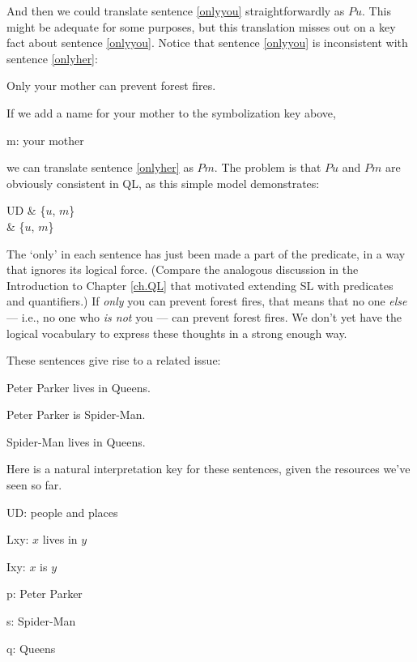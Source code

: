 And then we could translate sentence \ref{onlyyou} straightforwardly as $Pu$. This might be adequate for some purposes, but this translation misses out on a key fact about sentence \ref{onlyyou}. Notice that sentence \ref{onlyyou} is inconsistent with sentence \ref{onlyher}:

\begin{earg}
\item[\ex{onlyher}] Only your mother can prevent forest fires.
\end{earg}

If we add a name for your mother to the symbolization key above,

\begin{ekey}
\item[m:] your mother
\end{ekey}

we can translate sentence \ref{onlyher} as $Pm$. The problem is that $Pu$ and $Pm$ are obviously consistent in QL, as this simple model demonstrates:

\begin{partialmodel}
	UD & \{$u$, $m$\}\\
	 & \{$u$, $m$\}
\end{partialmodel}

The `only' in each sentence has just been made a part of the predicate, in a way that ignores its logical force. (Compare the analogous discussion in the Introduction to Chapter \ref{ch.QL} that motivated extending SL with predicates and quantifiers.) If \emph{only} you can prevent forest fires, that means that no one \emph{else} --- i.e., no one who \emph{is not} you --- can prevent forest fires. We don't yet have the logical vocabulary to express these thoughts in a strong enough way.

These sentences give rise to a related issue:

\begin{earg}
\item[\ex{ppq}] Peter Parker lives in Queens.
\item[\ex{pps}] Peter Parker is Spider-Man.
\item[\ex{sq}] Spider-Man lives in Queens.
\end{earg}

Here is a natural interpretation key for these sentences, given the resources we've seen so far.

\begin{ekey}
\item[UD:] people and places
\item[Lxy:] $x$ lives in $y$
\item[Ixy:] $x$ is $y$
\item[p:] Peter Parker
\item[s:] Spider-Man
\item[q:] Queens
\end{ekey}

